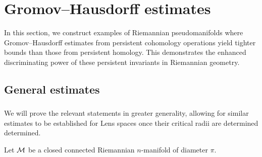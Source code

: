 
\section{Gromov--Hausdorff estimates}\label{s:gh_estimates}

In this section, we construct examples of Riemannian pseudomanifolds where Gromov--Hausdorff estimates from persistent cohomology operations yield tighter bounds than those from persistent homology.
This demonstrates the enhanced discriminating power of these persistent invariants in Riemannian geometry.



\subsection{General estimates}\label{ss:genberal_distance_comparison}

\subsubsection{}

We will prove the relevant statements in greater generality, allowing for similar estimates to be established for Lens spaces once their critical radii are determined determined.

Let $\mathcal{M}$ be a closed connected Riemannian \(n\)-manifold of diameter $\pi$.

